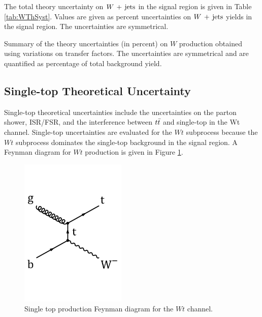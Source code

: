 \indent The total theory uncertainty on $W\,+\,\mathrm{jets}$ in the signal region is given in Table \ref{tab:WThSyst}.  Values are given as percent uncertainties on $W\,+\,\mathrm{jets}$ yields in the signal region.  The uncertainties are symmetrical. \\

  \begin{table}[!h]
    \begin{center} \footnotesize
    
    \end{center}
    \caption{Summary of the theory uncertainties (in percent) on $W$ production obtained using variations on transfer factors. The uncertainties are symmetrical and are quantified as percentage of total background yield.}
    \label{tab:WThSyst}
  \end{table}        

\subsection{Single-top Theoretical Uncertainty}

\indent Single-top theoretical uncertainties include the uncertainties on the parton shower, ISR/FSR, and the interference between $t\bar{t}$ and single-top in the Wt channel.  Single-top uncertainties are evaluated for the $Wt$ subprocess because the $Wt$ subprocess dominates the single-top background in the signal region.  A Feynman diagram for $Wt$ production is given in Figure \ref{fig:ST:feyn}.\\

\begin{figure}[h!]
\begin{center}
	\includegraphics[width=0.45\textwidth]{figures/feynDiag/tW_chan.png}
\end{center}
\caption[Single top production Feynman diagram for the $Wt$ channel.]{Single top production Feynman diagram for the $Wt$ channel. }
\label{fig:ST:feyn}
\end{figure}

